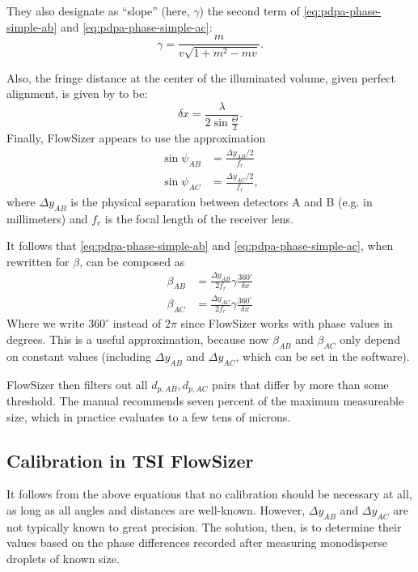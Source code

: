 \documentclass[11.5pt]{book}
\begin{document}
They also designate as ``slope'' (here, $\gamma$) the second term of
\eqref{eq:pdpa-phase-simple-ab} and \eqref{eq:pdpa-phase-simple-ac}:
\begin{equation}
    \gamma = \frac{m}{v \sqrt{1 + m^2 - mv}}.
\end{equation}

Also, the fringe distance at the center of the illuminated volume, given
perfect alignment, is given by \citet{Albrecht03} to be:
\begin{equation}
    \delta x = \frac{\lambda}{2 \sin \frac{\Theta}{2}}.
\end{equation}
Finally, FlowSizer appears to use the approximation 
\begin{align}
    \sin \psi_{AB} &= \frac{\Delta y_{AB}/2}{f_r} \\
    \sin \psi_{AC} &= \frac{\Delta y_{AC}/2}{f_r},
\end{align}
where $\Delta y_{AB}$ is the physical separation between detectors A and B (e.g. in
millimeters) and $f_r$ is the focal length of the receiver lens.

It follows that \eqref{eq:pdpa-phase-simple-ab} and \eqref{eq:pdpa-phase-simple-ac}, when
rewritten for $\beta$, can be composed as
\begin{align}
    \beta_{AB} &= \frac{\Delta y_{AB}}{2f_r} \gamma \frac{360^\circ}{\delta x} \\
    \beta_{AC} &= \frac{\Delta y_{AC}}{2f_r} \gamma \frac{360^\circ}{\delta x}
\end{align}
Where we write $360^\circ$ instead of $2\pi$ since FlowSizer works with phase
values in degrees. This is a useful approximation, because now $\beta_{AB}$ and
$\beta_{AC}$ only depend on constant values (including $\Delta y_{AB}$ and
$\Delta y_{AC}$, which can be set in the software).

FlowSizer then filters out all $d_{p,AB}, d_{p,AC}$ pairs that differ by more than some
threshold. The manual recommends seven percent of the maximum measureable size,
which in practice evaluates to a few tens of microns.

\subsection{Calibration in TSI FlowSizer}
It follows from the above equations that no calibration should be necessary at
all, as long as all angles and distances are well-known. However, $\Delta
y_{AB}$ and $\Delta y_{AC}$ are not typically known to great precision. The
solution, then, is to determine their values based on the phase differences
recorded after measuring monodisperse droplets of known size.
\end{document}
